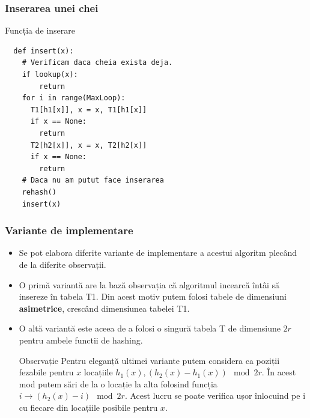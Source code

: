 \documentclass{beamer}
\begin{document}
\begin{frame}[fragile]
\frametitle{Inserarea unei chei}
\begin{block}{Funcția de inserare}
\begin{lstlisting}
  def insert(x):
  	# Verificam daca cheia exista deja.
  	if lookup(x):
  		return
   	for i in range(MaxLoop):
   	  T1[h1[x]], x = x, T1[h1[x]]
   	  if x == None:
   	    return
   	  T2[h2[x]], x = x, T2[h2[x]]
   	  if x == None:
   	    return
   	# Daca nu am putut face inserarea
   	rehash()
   	insert(x)
\end{lstlisting}
\end{block}

\end{frame}
\begin{frame}
\frametitle{Variante de implementare}
\begin{itemize}
\item Se pot elabora diferite variante de implementare a acestui algoritm plecând de la diferite observații.

\item O primă variantă are la bază observația că algoritmul incearcă întâi să insereze în tabela T1. Din acest motiv putem folosi tabele de dimensiuni \textbf{asimetrice}, crescând dimensiunea tabelei T1.

\item O altă variantă este aceea de a folosi o singură tabela T de dimensiune $2r$ pentru ambele functii de hashing.

\begin{block}{Observație}
Pentru eleganță ultimei variante putem considera ca poziții fezabile pentru $x$ locațiile $h_1(x), (h_2(x) - h_1(x)) \mod 2r$. În acest mod putem sări de la o locație la alta folosind funcția $i \to (h_2(x) - i) \mod 2r$. Acest lucru se poate verifica ușor înlocuind pe i cu fiecare din locațiile posibile pentru $x$.
\end{block}

\end{itemize}
\end{frame}
\end{document}
